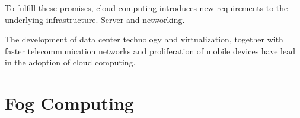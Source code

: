 To fulfill these promises, cloud computing introduces new requirements to the underlying infrastructure. Server and networking.

The development of data center technology and virtualization, together with faster telecommunication networks and proliferation of mobile devices have lead in the adoption of cloud computing.





\section{Fog Computing}
\label{section:fog-computing}




